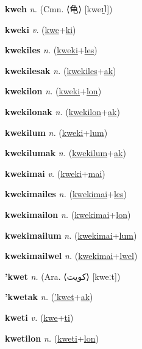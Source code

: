 \textbf{\hypertarget{kweh}{kweh}} \textit{n.} (Cmn. ⟨{\chinese{}龟}⟩ [kweɪ̯˥])


\textbf{\hypertarget{kweki}{kweki}} \textit{v.} (\hyperlink{kwe}{kwe}+\allowbreak \hyperlink{ki}{ki})


\textbf{\hypertarget{kwekiles}{kwekiles}} \textit{n.} (\hyperlink{kweki}{kweki}+\allowbreak \hyperlink{les}{les})


\textbf{\hypertarget{kwekilesak}{kwekilesak}} \textit{n.} (\hyperlink{kwekiles}{kwekiles}+\allowbreak \hyperlink{ak}{ak})


\textbf{\hypertarget{kwekilon}{kwekilon}} \textit{n.} (\hyperlink{kweki}{kweki}+\allowbreak \hyperlink{lon}{lon})


\textbf{\hypertarget{kwekilonak}{kwekilonak}} \textit{n.} (\hyperlink{kwekilon}{kwekilon}+\allowbreak \hyperlink{ak}{ak})


\textbf{\hypertarget{kwekilum}{kwekilum}} \textit{n.} (\hyperlink{kweki}{kweki}+\allowbreak \hyperlink{lum}{lum})


\textbf{\hypertarget{kwekilumak}{kwekilumak}} \textit{n.} (\hyperlink{kwekilum}{kwekilum}+\allowbreak \hyperlink{ak}{ak})


\textbf{\hypertarget{kwekimai}{kwekimai}} \textit{v.} (\hyperlink{kweki}{kweki}+\allowbreak \hyperlink{mai}{mai})


\textbf{\hypertarget{kwekimailes}{kwekimailes}} \textit{n.} (\hyperlink{kwekimai}{kwekimai}+\allowbreak \hyperlink{les}{les})


\textbf{\hypertarget{kwekimailon}{kwekimailon}} \textit{n.} (\hyperlink{kwekimai}{kwekimai}+\allowbreak \hyperlink{lon}{lon})


\textbf{\hypertarget{kwekimailum}{kwekimailum}} \textit{n.} (\hyperlink{kwekimai}{kwekimai}+\allowbreak \hyperlink{lum}{lum})


\textbf{\hypertarget{kwekimailwel}{kwekimailwel}} \textit{n.} (\hyperlink{kwekimai}{kwekimai}+\allowbreak \hyperlink{lwel}{lwel})


\textbf{\hypertarget{'kwet}{'kwet}} \textit{n.} (Ara. ⟨{\arabics{}كويت}⟩ [kweːt])


\textbf{\hypertarget{'kwetak}{'kwetak}} \textit{n.} (\hyperlink{'kwet}{'kwet}+\allowbreak \hyperlink{ak}{ak})


\textbf{\hypertarget{kweti}{kweti}} \textit{v.} (\hyperlink{kwe}{kwe}+\allowbreak \hyperlink{ti}{ti})


\textbf{\hypertarget{kwetilon}{kwetilon}} \textit{n.} (\hyperlink{kweti}{kweti}+\allowbreak \hyperlink{lon}{lon})


